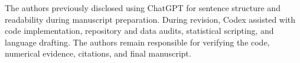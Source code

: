 The authors previously disclosed using ChatGPT for sentence structure and
readability during manuscript preparation. During revision, Codex assisted with
code implementation, repository and data audits, statistical scripting, and
language drafting. The authors remain responsible for verifying the code,
numerical evidence, citations, and final manuscript.
